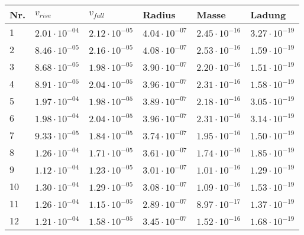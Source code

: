 \begin{table}[h]
	\centering
	\begin{tabular}{llllll}
		\toprule
		Nr. & $v_{rise}$ & $v_{fall}$ & Radius & Masse & Ladung \\
		\midrule
		1 &$\mathrm{2.01 \cdot 10^{-04}}$ & $\mathrm{2.12 \cdot 10^{-05}}$ & $\mathrm{4.04 \cdot 10^{-07}}$ & $\mathrm{2.45 \cdot 10^{-16}}$ & $\mathrm{3.27 \cdot 10^{-19}}$ \\
		2 &$\mathrm{8.46 \cdot 10^{-05}}$ & $\mathrm{2.16 \cdot 10^{-05}}$ & $\mathrm{4.08 \cdot 10^{-07}}$ & $\mathrm{2.53 \cdot 10^{-16}}$ & $\mathrm{1.59 \cdot 10^{-19}}$ \\
		3 &$\mathrm{8.68 \cdot 10^{-05}}$ & $\mathrm{1.98 \cdot 10^{-05}}$ & $\mathrm{3.90 \cdot 10^{-07}}$ & $\mathrm{2.20 \cdot 10^{-16}}$ & $\mathrm{1.51 \cdot 10^{-19}}$ \\
		4 &$\mathrm{8.91 \cdot 10^{-05}}$ & $\mathrm{2.04 \cdot 10^{-05}}$ & $\mathrm{3.96 \cdot 10^{-07}}$ & $\mathrm{2.31 \cdot 10^{-16}}$ & $\mathrm{1.58 \cdot 10^{-19}}$ \\
		5 &$\mathrm{1.97 \cdot 10^{-04}}$ & $\mathrm{1.98 \cdot 10^{-05}}$ & $\mathrm{3.89 \cdot 10^{-07}}$ & $\mathrm{2.18 \cdot 10^{-16}}$ & $\mathrm{3.05 \cdot 10^{-19}}$ \\
		6 &$\mathrm{1.98 \cdot 10^{-04}}$ & $\mathrm{2.04 \cdot 10^{-05}}$ & $\mathrm{3.96 \cdot 10^{-07}}$ & $\mathrm{2.31 \cdot 10^{-16}}$ & $\mathrm{3.14 \cdot 10^{-19}}$ \\
		7 &$\mathrm{9.33 \cdot 10^{-05}}$ & $\mathrm{1.84 \cdot 10^{-05}}$ & $\mathrm{3.74 \cdot 10^{-07}}$ & $\mathrm{1.95 \cdot 10^{-16}}$ & $\mathrm{1.50 \cdot 10^{-19}}$ \\
		8 &$\mathrm{1.26 \cdot 10^{-04}}$ & $\mathrm{1.71 \cdot 10^{-05}}$ & $\mathrm{3.61 \cdot 10^{-07}}$ & $\mathrm{1.74 \cdot 10^{-16}}$ & $\mathrm{1.85 \cdot 10^{-19}}$ \\
		9 &$\mathrm{1.12 \cdot 10^{-04}}$ & $\mathrm{1.23 \cdot 10^{-05}}$ & $\mathrm{3.01 \cdot 10^{-07}}$ & $\mathrm{1.01 \cdot 10^{-16}}$ & $\mathrm{1.29 \cdot 10^{-19}}$ \\
		10 &$\mathrm{1.30 \cdot 10^{-04}}$ & $\mathrm{1.29 \cdot 10^{-05}}$ & $\mathrm{3.08 \cdot 10^{-07}}$ & $\mathrm{1.09 \cdot 10^{-16}}$ & $\mathrm{1.53 \cdot 10^{-19}}$ \\
		11 &$\mathrm{1.26 \cdot 10^{-04}}$ & $\mathrm{1.15 \cdot 10^{-05}}$ & $\mathrm{2.89 \cdot 10^{-07}}$ & $\mathrm{8.97 \cdot 10^{-17}}$ & $\mathrm{1.37 \cdot 10^{-19}}$ \\
		12 &$\mathrm{1.21 \cdot 10^{-04}}$ & $\mathrm{1.58 \cdot 10^{-05}}$ & $\mathrm{3.45 \cdot 10^{-07}}$ & $\mathrm{1.52 \cdot 10^{-16}}$ & $\mathrm{1.68 \cdot 10^{-19}}$ \\

\end{tabular}
\end{table}
